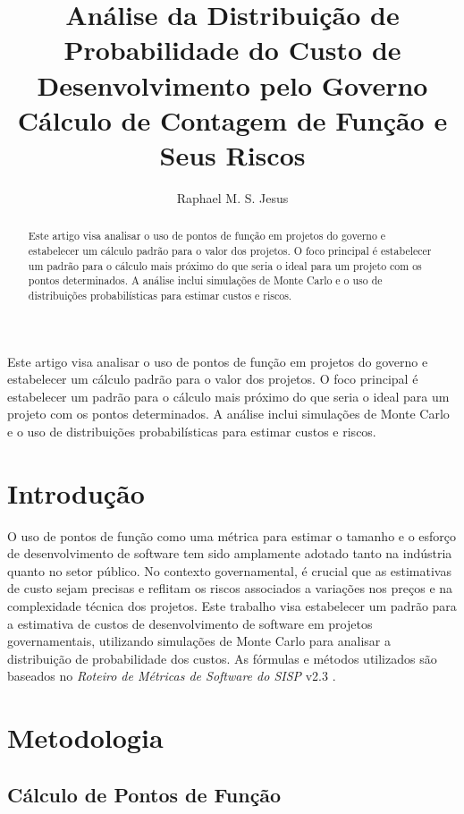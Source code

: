 \documentclass[12pt]{article}
\title{Análise da Distribuição de Probabilidade do Custo de Desenvolvimento pelo Governo\\ Cálculo de Contagem de Função e Seus Riscos}
\author{Raphael M. S. Jesus\inst{1}}
\begin{document}
 

\maketitle

\begin{abstract}
  Este artigo visa analisar o uso de pontos de função em projetos do governo e estabelecer um cálculo padrão para o valor dos projetos. O foco principal é estabelecer um padrão para o cálculo mais próximo do que seria o ideal para um projeto com os pontos determinados. A análise inclui simulações de Monte Carlo e o uso de distribuições probabilísticas para estimar custos e riscos.
\end{abstract}
     
\begin{resumo} 
  Este artigo visa analisar o uso de pontos de função em projetos do governo e estabelecer um cálculo padrão para o valor dos projetos. O foco principal é estabelecer um padrão para o cálculo mais próximo do que seria o ideal para um projeto com os pontos determinados. A análise inclui simulações de Monte Carlo e o uso de distribuições probabilísticas para estimar custos e riscos.
\end{resumo}

\section{Introdução}

O uso de pontos de função como uma métrica para estimar o tamanho e o esforço de desenvolvimento de software tem sido amplamente adotado tanto na indústria quanto no setor público. No contexto governamental, é crucial que as estimativas de custo sejam precisas e reflitam os riscos associados a variações nos preços e na complexidade técnica dos projetos. Este trabalho visa estabelecer um padrão para a estimativa de custos de desenvolvimento de software em projetos governamentais, utilizando simulações de Monte Carlo para analisar a distribuição de probabilidade dos custos. As fórmulas e métodos utilizados são baseados no \textit{Roteiro de Métricas de Software do SISP} v2.3 \cite{sisp}.

\section{Metodologia}

\subsection{Cálculo de Pontos de Função}
\end{document}
